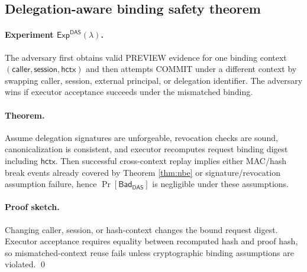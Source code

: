 \subsection{Delegation-aware binding safety theorem}
\label{app:proofs:das}

\paragraph{Experiment $\mathsf{Exp}^{\mathsf{DAS}}(\lambda)$.}
The adversary first obtains valid PREVIEW evidence for one binding context
$(\mathsf{caller},\mathsf{session},\mathsf{hctx})$ and then attempts COMMIT under a different context
by swapping caller, session, external principal, or delegation identifier.
The adversary wins if executor acceptance succeeds under the mismatched binding.

\paragraph{Theorem.}
\begin{theorem}\label{thm:das}
Assume delegation signatures are unforgeable, revocation checks are sound, canonicalization is
consistent, and executor recomputes request binding digest including $\mathsf{hctx}$.
Then successful cross-context replay implies either MAC/hash break events already covered by
Theorem \ref{thm:nbe} or signature/revocation assumption failure, hence
$\Pr[\mathsf{Bad}_{\mathsf{DAS}}]$ is negligible under these assumptions.
\end{theorem}

\paragraph{Proof sketch.}
Changing caller, session, or hash-context changes the bound request digest.
Executor acceptance requires equality between recomputed hash and proof hash, so mismatched-context
reuse fails unless cryptographic binding assumptions are violated.
\qed
